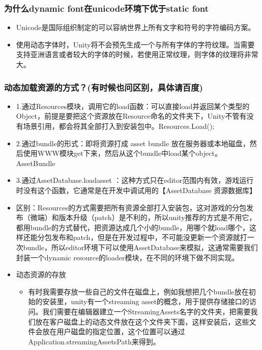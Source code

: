 \documentclass[9pt, b5paper]{article}
\begin{document}
\subsubsection{为什么dynamic font在unicode环境下优于static font}
\label{sec:orged8839a}
\begin{itemize}
\item Unicode是国际组织制定的可以容纳世界上所有文字和符号的字符编码方案。
\item 使用动态字体时，Unity将不会预先生成一个与所有字体的字符纹理。当需要支持亚洲语言或者较大的字体的时候，若使用正常纹理，则字体的纹理将非常大。
\end{itemize}

\subsubsection{动态加载资源的方式？(有时候也问区别，具体请百度)}
\label{sec:org6178c4f}
\begin{itemize}
\item 1.通过Resources模块，调用它的load函数：可以直接load并返回某个类型的Object，前提是要把这个资源放在Resource命名的文件夹下，Unity不管有没有场景引用，都会将其全部打入到安装包中。Resources.Load();
\item 2.通过bundle的形式：即将资源打成 asset bundle 放在服务器或本地磁盘，然后使用WWW模块get下来，然后从这个bundle中load某个object。AssetBundle
\item 3.通过AssetDatabase.loadasset ：这种方式只在editor范围内有效，游戏运行时没有这个函数，它通常是在开发中调试用的【AssetDatabase 资源数据库】
\item 区别：Resources的方式需要把所有资源全部打入安装包，这对游戏的分包发布（微端）和版本升级（patch）是不利的，所以unity推荐的方式是不用它，都用bundle的方式替代，把资源达成几个小的bundle，用哪个就load哪个，这样还能分包发布和patch，但是在开发过程中，不可能没更新一个资源就打一次bundle，所以editor环境下可以使用AssetDatabase来模拟，这通常需要我们封装一个dynamic resource的loader模块，在不同的环境下做不同实现。
\item 动态资源的存放
\begin{itemize}
\item 有时我需要存放一些自己的文件在磁盘上，例如我想把几个bundle放在初始的安装里，unity有一个streaming asset的概念，用于提供存储接口的访问。我们需要在编辑器建立一个StreamingAssets名字的文件夹，把需要我们放在客户磁盘上的动态文件放在这个文件夹下面，这样安装后，这些文件会放在用户磁盘的指定位置，这个位置可以通过Application.streamingAssetsPath来得到。
\end{itemize}
\end{itemize}
\end{document}
